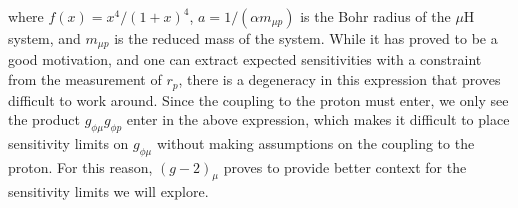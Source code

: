 \noindent where $f(x) = x^4/(1+x)^4$, $a = 1/(\alpha m_{\mu p})$ is the Bohr radius of the $\mu\textrm{H}$ system, and $m_{\mu p}$ is the reduced mass of the system.
While it has proved to be a good motivation, and one can extract expected sensitivities with a constraint from the measurement of $r_p$, there is a degeneracy in this expression that proves difficult to work around.
Since the coupling to the proton must enter, we only see the product $g_{\phi\mu} g_{\phi p}$ enter in the above expression, which makes it difficult to place sensitivity limits on $g_{\phi\mu}$ without making assumptions on the coupling to the proton.
For this reason, $(g-2)_\mu$ proves to provide better context for the sensitivity limits we will explore.
